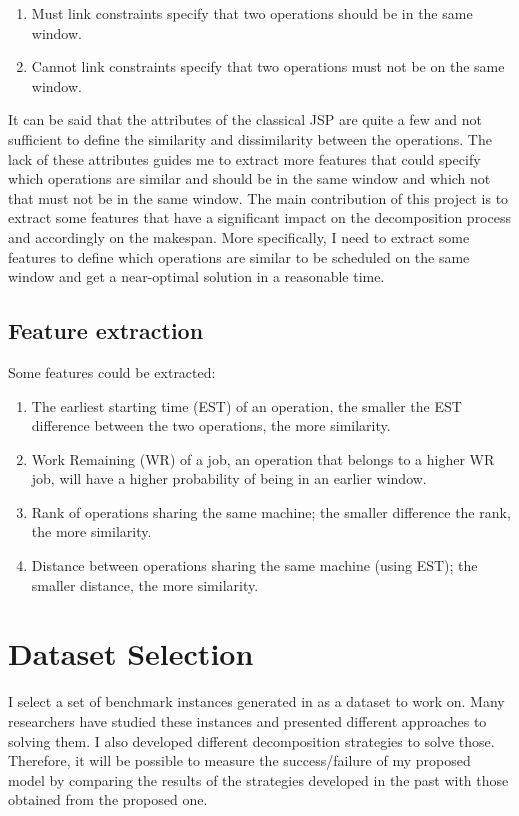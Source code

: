 \documentclass{article}
\begin{document}
\begin{enumerate}
    \item Must link constraints specify that two operations should be in the same window.
    \item Cannot link constraints specify that two operations must not be on the same window.
\end{enumerate}

It can be said that the attributes of the classical JSP are quite a few and not sufficient to define the similarity and dissimilarity between the operations. The lack of these attributes guides me to extract more features that could specify which operations are similar and should be in the same window and which not that must not be in the same window. The main contribution of this project is to extract some features that have a significant impact on the decomposition process and accordingly on the makespan. More specifically, I need to extract some features to define which operations are similar to be scheduled on the same window and get a near-optimal solution in a reasonable time. 

\subsection{Feature extraction}
Some features could be extracted:
\begin{enumerate}
    \item The earliest starting time (EST) of an operation, the smaller the EST difference between the two operations, the more similarity.
    \item Work Remaining (WR) of a job, an operation that belongs to a higher WR job, will have a higher probability of being in an earlier window.
    \item Rank of operations sharing the same machine; the smaller difference the rank, the more similarity.
    \item Distance between operations sharing the same machine (using EST); the smaller distance, the more similarity.
\end{enumerate}

\section{Dataset Selection}
I select a set of benchmark instances generated in \cite{taillard1993benchmarks} as a dataset to work on. Many researchers have studied these instances and presented different approaches to solving them. I also developed different decomposition strategies to solve those. Therefore, it will be possible to measure the success/failure of my proposed model by comparing the results of the strategies developed in the past with those obtained from the proposed one. 

\newpage


\end{document}
